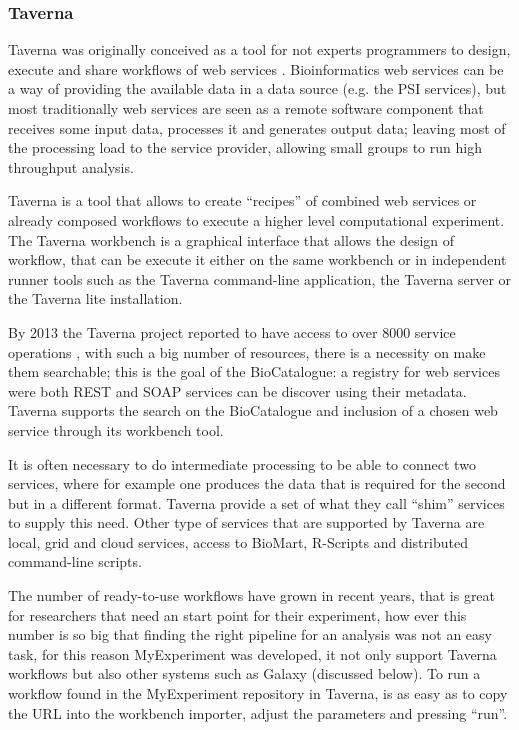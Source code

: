 \subsubsection{Taverna}
Taverna was originally conceived as a tool for not experts programmers to design, execute and share workflows of web services \cite{HUL2006}. Bioinformatics web services can be a way of providing the available data in a data source (e.g. the PSI services), but most traditionally web services are seen as a remote software component that receives some input data, processes it and generates output data; leaving most of the processing load to the service provider, allowing small groups to run high throughput analysis.

Taverna is a tool that allows to create ``recipes'' of combined web services or already composed workflows to execute a higher level computational experiment. The Taverna workbench is a graphical interface that allows the design of workflow, that can be execute it either on the same workbench or in independent runner tools such as the Taverna command-line application, the Taverna server or the Taverna lite installation.

By 2013 the Taverna project reported to have access to over 8000 service operations \cite{WOL2013}, with such a big number of resources, there is a necessity on make them searchable; this is the goal of the BioCatalogue: a registry for web services were both REST and SOAP services can be discover using their metadata. Taverna supports the search on the BioCatalogue and inclusion of a chosen web service through its workbench tool.

It is often necessary to do intermediate processing to be able to connect two services, where for example one produces the data that is required for the second but in a different format. Taverna provide a set of what they call ``shim'' services to supply this need. Other type of services that are supported by Taverna are local, grid and cloud services, access to BioMart, R-Scripts and distributed command-line scripts.

The number of ready-to-use workflows have grown in recent years, that is great for researchers that need an start point for their experiment, how ever this number is so big that finding the right pipeline for an  analysis was not an easy task, for this reason MyExperiment was developed, it not only support Taverna workflows but also other systems such as Galaxy (discussed below). To run a workflow found in the MyExperiment repository in Taverna, is as easy as to copy the URL into the workbench importer, adjust the parameters and pressing ``run''.


